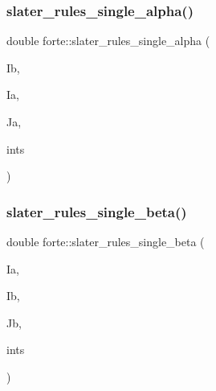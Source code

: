 \mbox{\label{namespaceforte_a5f0ac83cc1c44664be9d04f973790b71}} 
\subsubsection{\texorpdfstring{slater\+\_\+rules\+\_\+single\+\_\+alpha()}{slater\_rules\_single\_alpha()}}
{\footnotesize\ttfamily double forte\+::slater\+\_\+rules\+\_\+single\+\_\+alpha (\begin{DoxyParamCaption}\item[{\mbox{\hyperlink{namespaceforte_a840d1bfd3a8b3c16e09979212f37313f}{String}}}]{Ib,  }\item[{\mbox{\hyperlink{namespaceforte_a840d1bfd3a8b3c16e09979212f37313f}{String}}}]{Ia,  }\item[{\mbox{\hyperlink{namespaceforte_a840d1bfd3a8b3c16e09979212f37313f}{String}}}]{Ja,  }\item[{const std\+::shared\+\_\+ptr$<$ \mbox{\hyperlink{classforte_1_1_active_space_integrals}{Active\+Space\+Integrals}} $>$ \&}]{ints }\end{DoxyParamCaption})}

\mbox{\label{namespaceforte_aa05d7bfcc1000c654a1d40af3332c5d0}} 
\subsubsection{\texorpdfstring{slater\+\_\+rules\+\_\+single\+\_\+beta()}{slater\_rules\_single\_beta()}}
{\footnotesize\ttfamily double forte\+::slater\+\_\+rules\+\_\+single\+\_\+beta (\begin{DoxyParamCaption}\item[{\mbox{\hyperlink{namespaceforte_a840d1bfd3a8b3c16e09979212f37313f}{String}}}]{Ia,  }\item[{\mbox{\hyperlink{namespaceforte_a840d1bfd3a8b3c16e09979212f37313f}{String}}}]{Ib,  }\item[{\mbox{\hyperlink{namespaceforte_a840d1bfd3a8b3c16e09979212f37313f}{String}}}]{Jb,  }\item[{const std\+::shared\+\_\+ptr$<$ \mbox{\hyperlink{classforte_1_1_active_space_integrals}{Active\+Space\+Integrals}} $>$ \&}]{ints }\end{DoxyParamCaption})}

